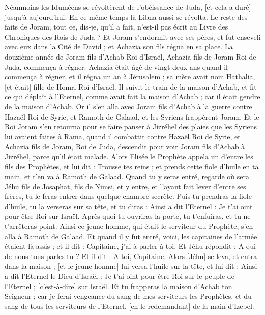 \begin{multicols}{2}
Néanmoins les Iduméens se révoltèrent de l'obéissance de Juda, [et cela a duré] jusqu'à aujourd'hui. En ce même temps-là Libna aussi se révolta.
Le reste des faits de Joram, tout ce, dis-je, qu'il a fait, n'est-il pas écrit au Livre des Chroniques des Rois de Juda ?
Et Joram s'endormit avec ses pères, et fut enseveli avec eux dans la Cité de David ; et Achazia son fils régna en sa place.
La douzième année de Joram fils d'Achab Roi d'Israël, Achazia fils de Joram Roi de Juda, commença à régner.
Achazia était âgé de vingt-deux ans quand il commença à régner, et il régna un an à Jérusalem ; sa mère avait nom Hathalia, [et était] fille de Homri Roi d'Israël.
Il suivit le train de la maison d'Achab, et fit ce qui déplaît à l'Eternel, comme avait fait la maison d'Achab ; car il était gendre de la maison d'Achab.
Or il s'en alla avec Joram fils d'Achab à la guerre contre Hazaël Roi de Syrie, et Ramoth de Galaad, et les Syriens frappèrent Joram.
Et le Roi Joram s'en retourna pour se faire panser à Jizréhel des plaies que les Syriens lui avaient faites à Rama, quand il combattit contre Hazaël Roi de Syrie, et Achazia fils de Joram, Roi de Juda, descendit pour voir Joram fils d'Achab à Jizréhel, parce qu'il était malade.
\VerseOne{}Alors Elisée le Prophète appela un d'entre les fils des Prophètes, et lui dit : Trousse tes reins ; et prends cette fiole d'huile en ta main, et t'en va à Ramoth de Galaad.
Quand tu y seras entré, regarde où sera Jéhu fils de Josaphat, fils de Nimsi, et y entre, et l'ayant fait lever d'entre ses frères, tu le feras entrer dans quelque chambre secrète.
Puis tu prendras la fiole d'huile, tu la verseras sur sa tête, et tu diras : Ainsi a dit l'Eternel : Je t'ai oint pour être Roi sur Israël. Après quoi tu ouvriras la porte, tu t'enfuiras, et tu ne t'arrêteras point.
Ainsi ce jeune homme, qui était le serviteur du Prophète, s'en alla à Ramoth de Galaad.
Et quand il y fut entré, voici, les capitaines de l'armée étaient là assis ; et il dit : Capitaine, j'ai à parler à toi. Et Jéhu répondit : A qui de nous tous parles-tu ? Et il dit : A toi, Capitaine.
Alors [Jéhu] se leva, et entra dans la maison ; [et le jeune homme] lui versa l'huile sur la tête, et lui dit : Ainsi a dit l'Eternel le Dieu d'Israël : Je t'ai oint pour être Roi sur le peuple de l'Eternel ; [c'est-à-dire] sur Israël.
Et tu frapperas la maison d'Achab ton Seigneur ; car je ferai vengeance du sang de mes serviteurs les Prophètes, et du sang de tous les serviteurs de l'Eternel, [en le redemandant] de la main d'Izebel.

\end{multicols}
